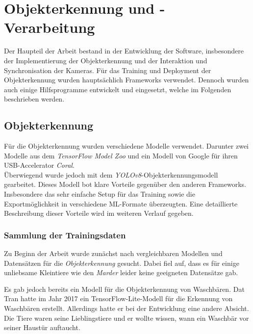 


\section{Objekterkennung und -Verarbeitung}

Der Haupteil der Arbeit bestand in der Entwicklung der Software, insbesondere der Implementierung der Objekterkennung und der Interaktion und Synchronisation der Kameras. Für das Training und Deployment der Objekterkennung wurden hauptsächlich Frameworks verwendet. Dennoch wurden auch einige Hilfsprogramme entwickelt und eingesetzt, welche im Folgenden beschrieben werden.

\subsection{Objekterkennung}

Für die Objekterkennung wurden verschiedene Modelle verwendet. Darunter zwei Modelle aus dem \textit{TensorFlow Model Zoo} und ein Modell von Google für ihren USB-Accelerator \textit{Coral}.
\\
Überwiegend wurde jedoch mit dem \textit{YOLOv8}-Objekterkennungsmodell gearbeitet. Dieses Modell bot klare Vorteile gegenüber den anderen Frameworks. Insbesondere das sehr einfache Setup für das Training sowie die Exportmöglichkeit in verschiedene \ac{ML}-Formate überzeugten. Eine detaillierte Beschreibung dieser Vorteile wird im weiteren Verlauf gegeben.

\subsubsection{Sammlung der Trainingsdaten}

Zu Beginn der Arbeit wurde zunächst nach vergleichbaren Modellen und Datensätzen für die \textit{Objekterkennung} gesucht. Dabei fiel auf, dass es für einige unliebsame Kleintiere wie den \textit{Marder} leider keine geeigneten Datensätze gab.

Es gab jedoch bereits ein Modell für die Objekterkennung von Waschbären. Dat Tran hatte im Jahr 2017 ein TensorFlow-Lite-Modell für die Erkennung von Waschbären erstellt. Allerdings hatte er bei der Entwicklung eine andere Absicht. Die Tiere waren seine Lieblingstiere und er wollte wissen, wann ein Waschbär vor seiner Haustür auftaucht.
\cite{wasch_detect}

